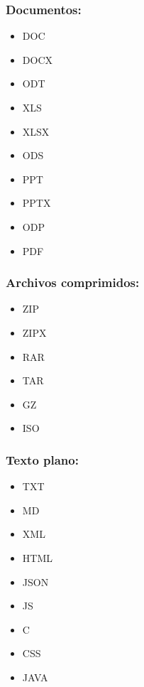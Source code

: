 \begin{minipage}[t]{0.3\textwidth}
    \subsubsection*{Documentos:}

    \begin{itemize}
        \item DOC
        \item DOCX
        \item ODT
        \item XLS
        \item XLSX
        \item ODS
        \item PPT
        \item PPTX
        \item ODP
        \item PDF
    \end{itemize}
\end{minipage}
\begin{minipage}[t]{0.3\textwidth}
    \subsubsection*{Archivos comprimidos:}

    \begin{itemize}
        \item ZIP
        \item ZIPX
        \item RAR
        \item TAR
        \item GZ
        \item ISO
    \end{itemize}
\end{minipage}
\begin{minipage}[t]{0.3\textwidth}
    \subsubsection*{Texto plano:}

    \begin{itemize}
        \item TXT
        \item MD
        \item XML
        \item HTML
        \item JSON
        \item JS
        \item C
        \item CSS
        \item JAVA
    \end{itemize}
\end{minipage}

